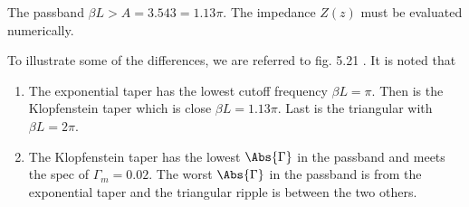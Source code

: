 {\begin{itemize}
The passband \( \beta L > A  = 3.543 = 1.13 \pi \).  The impedance \( Z(z) \) must be evaluated numerically.
\end{itemize}

To illustrate some of the differences, we are referred to fig. 5.21 \citep{pozar2009microwave}.  It is noted that
\begin{enumerate}
\item The exponential taper has the lowest cutoff frequency \( \beta L = \pi \).  Then is the Klopfenstein taper which is close \( \beta L = 1.13 \pi \).  Last is the triangular with \( \beta L = 2 \pi \).
\item The Klopfenstein taper has the lowest \( \Abs{\Gamma} \) in the passband and meets the spec of \( \Gamma_m = 0.02 \).  The worst \( \Abs{\Gamma} \) in the passband is from the exponential taper and the triangular ripple is between the two others.
\end{enumerate}
} %

